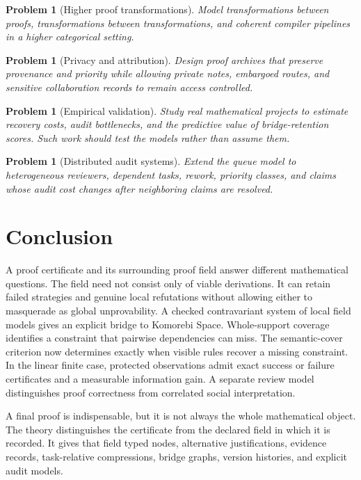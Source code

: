 \documentclass[11pt,oneside]{article}
\theoremstyle{komorebiplain}
\theoremstyle{komorebidefinition}
\newtheorem{problem}[theorem]{Problem}
\theoremstyle{komorebiremark}
\begin{document}
\begin{problem}[Higher proof transformations]
\label{res:28:8}
Model transformations between proofs, transformations between transformations, and coherent compiler pipelines in a higher categorical setting.
\end{problem}

\begin{problem}[Privacy and attribution]
\label{res:28:9}
Design proof archives that preserve provenance and priority while allowing private notes, embargoed routes, and sensitive collaboration records to remain access controlled.
\end{problem}

\begin{problem}[Empirical validation]
\label{res:28:10}
Study real mathematical projects to estimate recovery costs, audit bottlenecks, and the predictive value of bridge-retention scores. Such work should test the models rather than assume them.
\end{problem}

\begin{problem}[Distributed audit systems]
\label{res:28:11}
Extend the queue model to heterogeneous reviewers, dependent tasks, rework, priority classes, and claims whose audit cost changes after neighboring claims are resolved.
\end{problem}


\clearpage
\section{Conclusion}
\label{sec:old29}

A proof certificate and its surrounding proof field answer different mathematical questions. The field need not consist only of viable derivations. It can retain failed strategies and genuine local refutations without allowing either to masquerade as global unprovability. A checked contravariant system of local field models gives an explicit bridge to Komorebi Space. Whole-support coverage identifies a constraint that pairwise dependencies can miss. The semantic-cover criterion now determines exactly when visible rules recover a missing constraint. In the linear finite case, protected observations admit exact success or failure certificates and a measurable information gain. A separate review model distinguishes proof correctness from correlated social interpretation.



A final proof is indispensable, but it is not always the whole mathematical object. The theory distinguishes the certificate from the declared field in which it is recorded. It gives that field typed nodes, alternative justifications, evidence records, task-relative compressions, bridge graphs, version histories, and explicit audit models.
\end{document}
